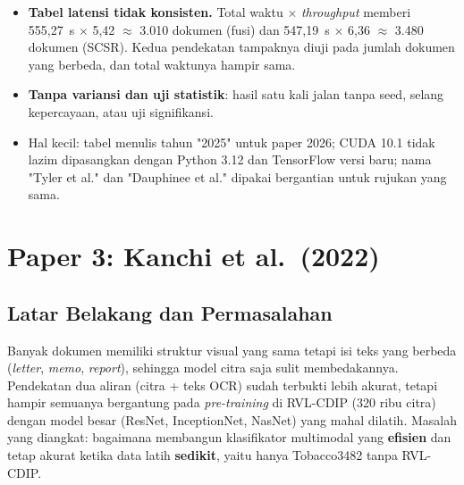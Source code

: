 \begin{itemize}
        (ii) Algoritma~6 meng-embed dokumen uji utuh tanpa \emph{chunking}, sehingga
        dokumen panjang kemungkinan terpotong di 512 token; hal ini tidak dibahas.
        (iii) Voting top-10 dilakukan per \emph{chunk}, bukan per dokumen. Satu dokumen latih
        yang panjang bisa menyumbang banyak \emph{chunk}, sehingga voting condong ke kelas
        yang teksnya panjang.
  \item \textbf{Tabel latensi tidak konsisten.} Total waktu $\times$ \emph{throughput}
        memberi 555,27~s $\times$ 5,42 $\approx$ 3.010 dokumen (fusi) dan 547,19~s
        $\times$ 6,36 $\approx$ 3.480 dokumen (SCSR). Kedua pendekatan tampaknya diuji pada
        jumlah dokumen yang berbeda, dan total waktunya hampir sama.
  \item \textbf{Tanpa variansi dan uji statistik}: hasil satu kali jalan tanpa seed, selang
        kepercayaan, atau uji signifikansi.
  \item Hal kecil: tabel menulis tahun "2025" untuk paper 2026; CUDA 10.1 tidak lazim
        dipasangkan dengan Python 3.12 dan TensorFlow versi baru; nama "Tyler et al."
        dan "Dauphinee et al." dipakai bergantian untuk rujukan yang sama.
\end{itemize}

\section{Paper 3: Kanchi et al.\ (2022)}\label{sec:kanchi}

\subsection{Latar Belakang dan Permasalahan}
Banyak dokumen memiliki struktur visual yang sama tetapi isi teks yang berbeda
(\emph{letter}, \emph{memo}, \emph{report}), sehingga model citra saja sulit membedakannya.
Pendekatan dua aliran (citra + teks OCR) sudah terbukti lebih akurat, tetapi hampir
semuanya bergantung pada \emph{pre-training} di RVL-CDIP (320 ribu citra) dengan model
besar (ResNet, InceptionNet, NasNet) yang mahal dilatih. Masalah yang diangkat: bagaimana
membangun klasifikator multimodal yang \textbf{efisien} dan tetap akurat ketika data
latih \textbf{sedikit}, yaitu hanya Tobacco3482 tanpa RVL-CDIP.

